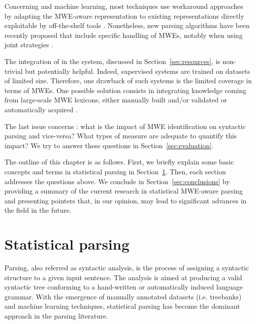 \documentclass[output=paper]{LSP/langsci}
\begin{document}
Concerning  and machine learning, most techniques use worka\-round approaches by adapting the MWE-aware representation to existing representations directly exploitable by off-the-shelf tools \citep{nasretal15}. Nonetheless, new parsing algorithms have been recently proposed that include specific handling of MWEs, notably when using joint strategies \citep{nivre:2014}. 

The integration of  in the system, discussed in  Section~\ref{sec:resources}, is non-trivial but potentially helpful. Indeed, supervised systems are trained on datasets of limited size. Therefore, one drawback of such systems is the limited coverage in terms of MWEs. One possible solution consists in integrating knowledge coming from large-scale MWE lexicons, either manually built and/or validated \citep{candito2014strategies} or automatically acquired \citep{schneider:2012}.

The last issue concerns : what is the impact of MWE identification on syntactic parsing and vice-versa? What types of measure are adequate to quantify this impact? We try to answer these questions in Section~\ref{sec:evaluation}.


The outline of this chapter is as follows. First, we briefly explain some basic concepts and terms in statistical parsing in Section~\ref{sec:parsing}. Then, each section addresses the questions above. We conclude in Section~\ref{sec:conclusions} by providing a summary of the current research in statistical MWE-aware parsing and presenting pointers that, in our opinion, may lead to significant advances in the field in the future.



%
\section{Statistical parsing}
\label{sec:parsing}

Parsing, also referred as syntactic analysis, is the process of assigning a syntactic structure to a given input sentence.
The analysis is aimed at producing a valid syntactic tree conforming to a hand-written or automatically induced language grammar.
With the emergence of manually annotated datasets (i.e. treebanks) and machine learning techniques,
statistical parsing \citep{collins1996new,charniak2000maximum} has become the dominant approach in the parsing literature. 
\end{document}
